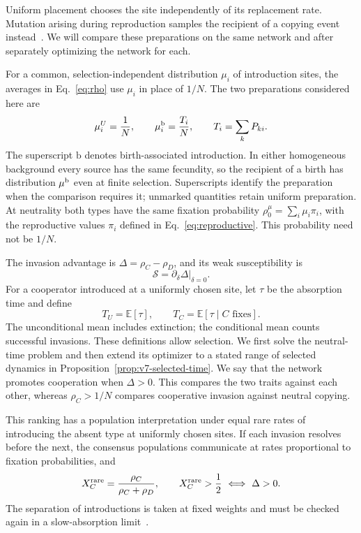 \documentclass[aps,pre,reprint,amsmath,amssymb,longbibliography]{revtex4-2}
\newcommand{\E}{\mathbb E}
\begin{document}
Uniform placement chooses the site independently of its replacement
rate. Mutation arising during reproduction samples the recipient of a
copying event instead~\cite{McAvoyRaoHauert2021}. We will compare these
preparations on the same network and after separately optimizing the
network for each.

For a common, selection-independent distribution $\mu_i$ of introduction
sites, the averages in Eq.~\eqref{eq:rho} use $\mu_i$ in place of $1/N$.
The two preparations considered here are
\begin{equation}
 \mu_i^U=\frac1N,\qquad
 \mu_i^{\rm b}=\frac{T_i}{N},\qquad T_i=\sum_kP_{ki}.
 \label{eq:v7-preparation}
\end{equation}
The superscript $\mathrm b$ denotes birth-associated introduction.
In either homogeneous background every source has the same fecundity,
so the recipient of a birth has distribution $\mu^{\rm b}$ even at
finite selection. Superscripts identify the preparation when the
comparison requires it; unmarked quantities retain uniform preparation.
At neutrality both types have the same fixation probability
$\rho_0^\mu=\sum_i\mu_i\pi_i$, with the reproductive values $\pi_i$
defined in Eq.~\eqref{eq:reproductive}. This probability need not be $1/N$.


The invasion advantage is $\Delta=\rho_C-\rho_D$, and its weak
susceptibility is
\begin{equation}
 \mathcal S=\left.\partial_\delta\Delta\right|_{\delta=0}.
 \label{eq:response}
\end{equation}
For a cooperator introduced at a uniformly chosen site, let $\tau$ be
the absorption time and define
\begin{equation}
 T_U=\E[\tau],\qquad T_C=\E[\tau\mid C\text{ fixes}].
 \label{eq:times-definition}
\end{equation}
The unconditional mean includes extinction; the conditional mean counts
successful invasions. These definitions allow selection. We first solve the neutral-time problem
and then extend its optimizer to a stated range of selected dynamics in
Proposition~\ref{prop:v7-selected-time}. We say that the
network promotes cooperation when $\Delta>0$. This compares the two
traits against each other, whereas $\rho_C>1/N$ compares cooperative
invasion against neutral copying.

This ranking has a population interpretation under equal rare rates of
introducing the absent type at uniformly chosen sites. If each invasion
resolves before the next, the consensus populations communicate at
rates proportional to fixation probabilities, and
\begin{equation}
 X_C^{\rm rare}=\frac{\rho_C}{\rho_C+\rho_D},
 \qquad
 X_C^{\rm rare}>\frac12\ \Longleftrightarrow\ \Delta>0 .
 \label{eq:rare-abundance}
\end{equation}
The separation of introductions is taken at fixed weights and must be
checked again in a slow-absorption limit~\cite{McAvoyAllen2021}.
\end{document}

